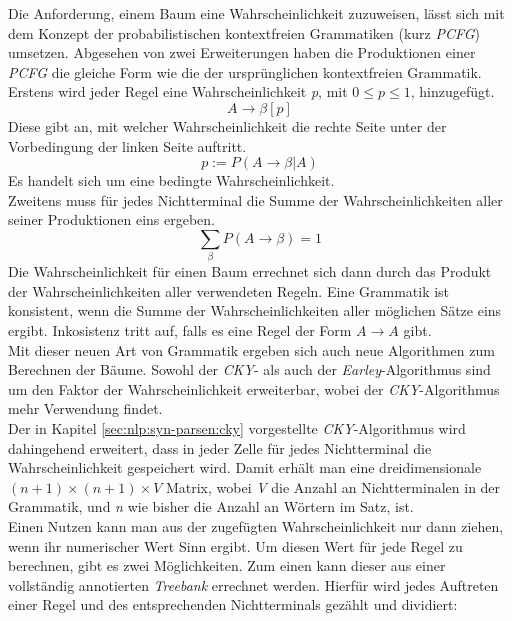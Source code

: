 Die Anforderung, einem Baum eine Wahrscheinlichkeit zuzuweisen, lässt sich mit dem Konzept der probabilistischen kontextfreien Grammatiken (kurz \textit{PCFG}) umsetzen. Abgesehen von zwei Erweiterungen haben die Produktionen einer \textit{PCFG} die gleiche Form wie die der ursprünglichen kontextfreien Grammatik. Erstens wird jeder Regel eine Wahrscheinlichkeit \textit{p}, mit \( 0 \leq p \leq 1 \), hinzugefügt.
\begin{equation}
A \to \beta  [p]
\end{equation}
Diese gibt an, mit welcher Wahrscheinlichkeit die rechte Seite unter der Vorbedingung der linken Seite auftritt.
\begin{equation}
p := P(A \to \beta | A)
\end{equation}
Es handelt sich um eine bedingte Wahrscheinlichkeit.\\ 
Zweitens muss für jedes Nichtterminal die Summe der Wahrscheinlichkeiten aller seiner Produktionen eins ergeben.
\begin{equation}
\sum_{\beta} P(A \to \beta) = 1
\end{equation}
Die Wahrscheinlichkeit für einen Baum errechnet sich dann durch das Produkt der Wahrscheinlichkeiten aller verwendeten Regeln. Eine Grammatik ist konsistent, wenn die Summe der Wahrscheinlichkeiten aller möglichen Sätze eins ergibt. Inkosistenz tritt auf, falls es eine Regel der Form \( A \to A \) gibt.\\
Mit dieser neuen Art von Grammatik ergeben sich auch neue Algorithmen zum Berechnen der Bäume. Sowohl der \textit{CKY}- als auch der \textit{Earley}-Algorithmus sind um den Faktor der Wahrscheinlichkeit erweiterbar, wobei der \textit{CKY}-Algorithmus mehr Verwendung findet. \\
Der in Kapitel \ref{sec:nlp:syn-parsen:cky} vorgestellte \textit{CKY}-Algorithmus wird dahingehend erweitert, dass in jeder Zelle für jedes Nichtterminal die Wahrscheinlichkeit gespeichert wird. Damit erhält man eine dreidimensionale \( (n+1) \times (n+1) \times V\) Matrix, wobei \textit{V} die Anzahl an Nichtterminalen in der Grammatik, und \textit{n} wie bisher die Anzahl an Wörtern im Satz, ist. \\
Einen Nutzen kann man aus der zugefügten Wahrscheinlichkeit nur dann ziehen, wenn ihr numerischer Wert Sinn ergibt. Um diesen Wert für jede Regel zu berechnen, gibt es zwei Möglichkeiten. Zum einen kann dieser aus einer vollständig annotierten \textit{Treebank} errechnet werden. Hierfür wird jedes Auftreten einer Regel und des entsprechenden Nichtterminals gezählt und dividiert: 
